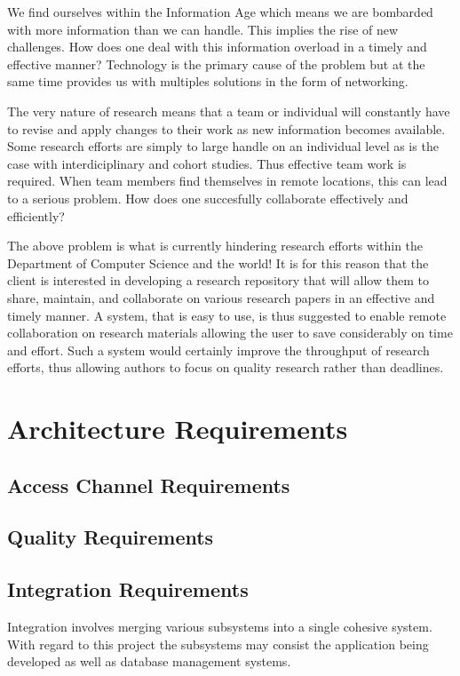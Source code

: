 \documentclass[a4paper,12pt]{article}
\begin{document}
We find ourselves within the Information Age which means we are bombarded with more information than we can handle. This implies the rise of new challenges. How does one deal with this information overload in a timely and effective manner? Technology is the primary cause of the problem but at the same time provides us with multiples solutions in the form of networking. 

The very nature of research means that a team or individual will constantly have to revise and apply changes to their work as new information becomes available. Some research efforts are simply to large handle on an individual level as is the case with interdiciplinary and cohort studies. Thus effective team work is required. When team members find themselves in remote locations, this can lead to a serious problem. How does one succesfully collaborate effectively and efficiently?

The above problem is what is currently hindering research efforts within the Department of Computer Science and the world! It is for this reason that the client is interested in developing a research repository that will allow them to share, maintain, and collaborate on various research papers in an effective and timely manner. A system, that is easy to use, is thus suggested to enable remote collaboration on research materials allowing the user to save considerably on time and effort. Such a system would certainly improve the throughput of research efforts, thus allowing authors to focus on quality research rather than deadlines.  

\newpage
\section{Architecture Requirements}
\subsection{Access Channel Requirements}
\subsection{Quality Requirements}
\subsection{Integration Requirements}
Integration involves merging various subsystems into a single cohesive system. With regard to this project the subsystems may consist the application being developed as well as database management systems.
\end{document}
